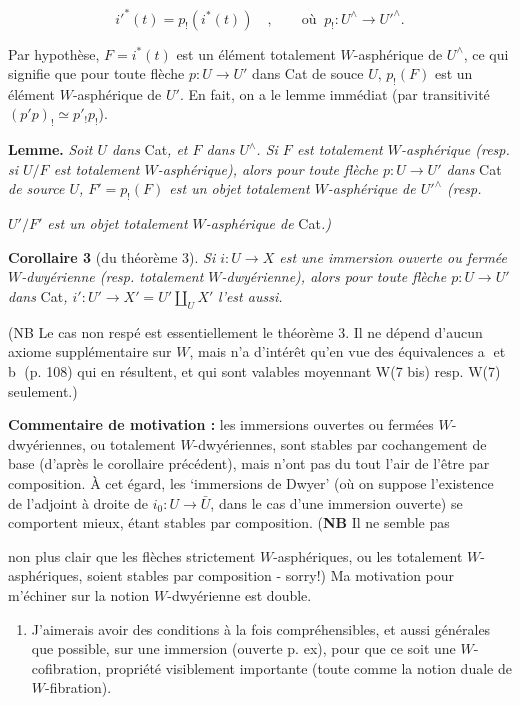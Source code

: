 \documentclass[11pt]{article}
\newcommand{\msp}[1]{\marginpar{\footnotesize [#1]}}
\begin{document}
\[ i'^*(t)=p_!(i^*(t))\quad,\qquad\text{où }\ p_!:U^\wedge\longrightarrow U'^\wedge. \]

Par hypothèse, $F=i^*(t)$ est un élément totalement $W$-asphérique de $U^\wedge$, ce qui signifie que pour toute flèche $p:U\longrightarrow U'$ dans Cat de souce $U$, $p_!(F)$ est un élément $W$-asphérique de $U'$. En fait, on a le lemme immédiat (par transitivité $(p'p)_!\simeq p'_!p_!$). %

\textbf{Lemme.} \textit{Soit $U$ dans} Cat\textit{, et $F$ dans $U^\wedge$. Si $F$ est totalement $W$-asphérique (resp. si $U/F$ est totalement $W$-asphérique), alors pour toute flèche $p:U\longrightarrow U'$ dans} Cat \textit{de source $U$, $F'=p_!(F)$ est un objet totalement $W$-asphérique de $U'^\wedge$ (resp.}

\msp{page 113}

\textit{$U'/F'$ est un objet totalement $W$-asphérique de} Cat\textit{.)}

\textbf{Corollaire 3} (du théorème 3). \textit{Si $i:U\longrightarrow X$ est une immersion ouverte ou fermée $W$-dwyérienne (resp. totalement $W$-dwyérienne), alors pour toute flèche $p:U\longrightarrow U'$ dans} Cat\textit{, $i':U'\longrightarrow X'=U'\amalg_U X'$} \textit{l'est aussi.}

(NB Le cas non respé est essentiellement le théorème 3. Il ne dépend d'aucun axiome supplémentaire sur $W$, mais n'a d'intérêt qu'en vue des équivalences \textcircled{a} et \textcircled{b} (p. 108) qui en résultent, et qui sont valables moyennant W(7 bis) resp. W(7) seulement.)

\textbf{Commentaire de motivation :} les immersions ouvertes ou fermées $W$-dwyériennes, ou totalement $W$-dwyériennes, sont stables par cochangement de base (d'après le corollaire précédent), mais n'ont pas du tout l'air de l'être par composition. À cet égard, les `immersions de Dwyer' (où on suppose l'existence de l'adjoint à droite de $i_0:U\longrightarrow\bar{U}$, dans le cas d'une immersion ouverte) se comportent mieux, étant stables par composition. (\textbf{NB} Il ne semble pas

\msp{page 114}

non plus clair que les flèches strictement $W$-asphériques, ou les totalement $W$-asphériques, soient stables par composition - sorry!) Ma motivation pour m'échiner sur la notion $W$-dwyérienne est double.

\begin{enumerate}[label=\alph*)]
\item J'aimerais avoir des conditions à la fois compréhensibles, et aussi générales que possible, sur une immersion (ouverte p. ex), pour que ce soit une $W$-cofibration, propriété visiblement importante (toute comme la notion duale de $W$-fibration). %
\end{enumerate}
\end{document}
